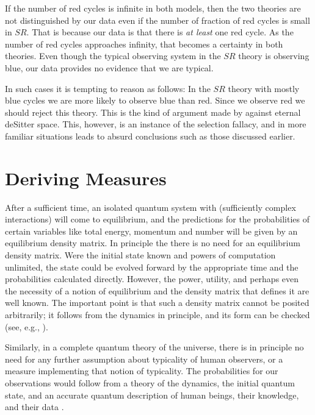 \documentclass[pra,twocolumn,nofootinbib,eqsecnum,floatfix]{revtex4}
\begin{document}
If the number of red cycles is infinite in both models, then the two theories are not distinguished by our data even if the number of fraction of red cycles is small in $SR$. That is because our data is that there is {\it at least} one red cycle. As the number of red cycles approaches infinity, that becomes a certainty in both theories. Even though the typical observing system in the $SR$ theory is observing blue, our data provides no evidence that we are typical. 

In such cases it is tempting to reason as follows:  In the $SR$ theory with mostly blue cycles we are more likely to observe blue than red. Since we observe red we should reject this theory. This is the kind of argument made by \cite{DKS02} against eternal deSitter space.  This, however, is an instance of the selection fallacy, and in more familiar situations leads to absurd conclusions such as those discussed earlier. 

\section{Deriving Measures}
 After a sufficient time,  an isolated quantum system with (sufficiently complex interactions) will come to equilibrium, and the predictions for the probabilities of certain variables like total energy, momentum and number will be given by an equilibrium density matrix. In principle the there is no need for  an equilibrium density matrix. Were the initial state known and powers of computation unlimited, the state could be evolved forward by the appropriate time and the probabilities calculated directly. However,  the power, utility, and perhaps even the necessity of a notion of equilibrium and the density matrix that defines it are well known. The important point is that such a density matrix cannot be posited arbitrarily; it follows from the dynamics in principle, and its form can be checked (see, e.g., \cite{Sred94}). 

Similarly, in a complete quantum theory of the universe, there is in principle no need for any further assumption about typicality of human observers, or a measure implementing that notion of typicality.  The probabilities for our observations would follow from a theory of the dynamics, the initial quantum state, and an accurate quantum description of human beings, their knowledge, and their data \cite{Har04}.
\end{document}
